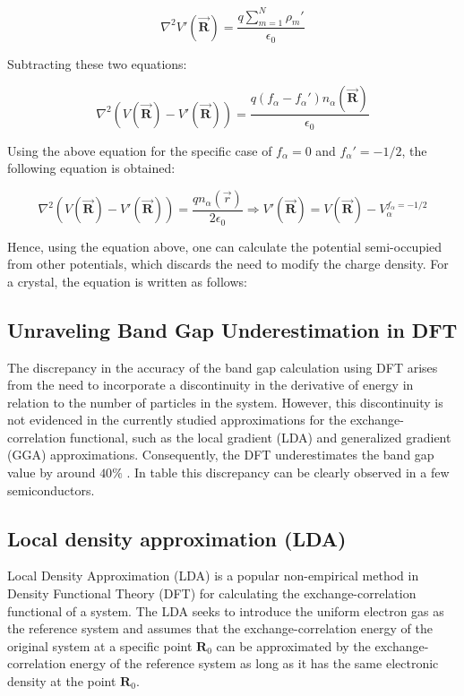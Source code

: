 \begin{equation}
\nabla^{2}V{'}(\vec{\mathbf{R}}) = \frac{q\sum_{m=1}^{N}\rho_{m}{'}}{\epsilon_{0}}  
\end{equation}
   
Subtracting these two equations:

\begin{equation}
\nabla^{2}(V(\vec{\mathbf{R}})-V{'}(\vec{\mathbf{R}})) = \frac{q(f_{\alpha}-f_{\alpha}{'})n_{\alpha}(\vec{\mathbf{R}})}{\epsilon_{0}}    
\end{equation}
   

Using the above equation for the specific case of $f_{\alpha} = 0$ and $f_{\alpha}{'} = -1/2$, the following equation is obtained:

\begin{equation}
\nabla^{2}(V(\vec{\mathbf{R}})-V{'}(\vec{\mathbf{R}})) = \frac{qn_{\alpha}(\vec{r})}{2\epsilon_{0}}\Rightarrow V{'}(\vec{\mathbf{R}}) = V(\vec{\mathbf{R}}) - V_{\alpha}^{f_{\alpha}=-1/2}    
\end{equation}
   
Hence, using the equation above, one can calculate the potential semi-occupied from other potentials, which discards the need to modify the charge density. For a crystal, the equation is written as follows:
\subsection{Unraveling Band Gap Underestimation in DFT}
The discrepancy in the accuracy of the band gap calculation using DFT arises from the need to incorporate a discontinuity in the derivative of energy in relation to the number of particles in the system. However, this discontinuity is not evidenced in the currently studied approximations for the exchange-correlation functional, such as the local gradient (LDA) and generalized gradient (GGA) approximations. Consequently, the DFT underestimates the band gap value by around $40\%$ \cite{PhysRevLett.51.1884}. In table  this discrepancy can be clearly observed in a few semiconductors.
\subsection{Local density approximation (LDA)}
Local Density Approximation (LDA) \cite{PhysRev.140.A1133} is a popular non-empirical method in Density Functional Theory (DFT) for calculating the exchange-correlation functional of a system. The LDA seeks to introduce the uniform electron gas as the reference system and assumes that the exchange-correlation energy of the original system at a specific point $\mathbf{R}_{0}$ can be approximated by the exchange-correlation energy of the reference system as long as it has the same electronic density at the point $\mathbf{R}_{0}$.

